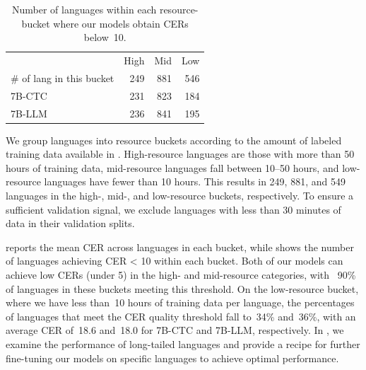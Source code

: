 \documentclass[]{fairmeta}
\begin{document}
\begin{table}[htbp]
  \centering
  \begin{tabular}{lrrr}
    \toprule
     &  High  &  Mid  &  Low  \\
    \# of lang in this bucket   &  249 & 881  & 546  \\
    \midrule
    7B-CTC & 231 & 823 & 184 \\
    7B-LLM & 236 & 841 & 195 \\
    \bottomrule
  \end{tabular}
  \caption{Number of languages within each resource-bucket where our models obtain CERs below~10.}
  \label{tab:resource_bucket_cer_threshold}
\end{table}

We group languages into resource buckets according to the amount of labeled training data available in \allasr{}. High-resource languages are those with more than 50 hours of training data, mid-resource languages fall between 10–50 hours, and low-resource languages have fewer than 10 hours. This results in 249, 881, and 549 languages in the high-, mid-, and low-resource buckets, respectively. To ensure a sufficient validation signal, we exclude languages with less than 30 minutes of data in their validation splits.

 reports the mean CER across languages in each bucket, while  shows the number of languages achieving CER < 10 within each bucket. Both of our models can achieve low CERs (under 5) in the high- and mid-resource categories, with ~90\% of languages in these buckets meeting this threshold. On the low-resource bucket, where we have less than~10 hours of training data per language, the percentages of languages that meet the CER quality threshold fall to~34\% and~36\%, with an average CER of~18.6 and~18.0 for 7B-CTC and 7B-LLM, respectively. In , we examine the performance of long-tailed languages and provide a recipe for further fine-tuning our models on specific languages to achieve optimal performance.
\end{document}
